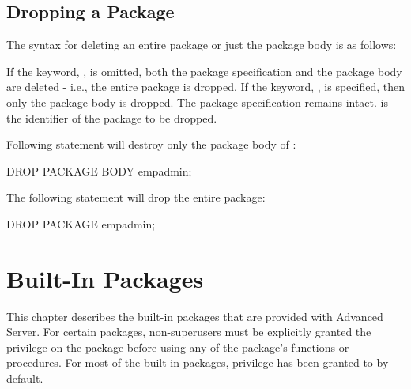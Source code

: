 \documentclass[letterpaper,10pt,english,openany,oneside]{sphinxmanual}
\begin{document}
\newpage


\section{Dropping a Package}
\label{\detokenize{dropping_a_package::doc}}\label{\detokenize{dropping_a_package:dropping-a-package}}
The syntax for deleting an entire package or just the package body is as
follows:


If the keyword, , is omitted, both the package specification and the
package body are deleted - i.e., the entire package is dropped. If the
keyword, , is specified, then only the package body is dropped. The
package specification remains intact.  is the identifier
of the package to be dropped.

Following statement will destroy only the package body of :

%
\begin{sphinxVerbatim}[commandchars=\\\{\}]
DROP PACKAGE BODY emp\PYGZus{}admin;
\end{sphinxVerbatim}

The following statement will drop the entire  package:

%
\begin{sphinxVerbatim}[commandchars=\\\{\}]
DROP PACKAGE emp\PYGZus{}admin;
\end{sphinxVerbatim}

\newpage


\chapter{Built-In Packages}
\label{\detokenize{built-in_packages::doc}}\label{\detokenize{built-in_packages:built-in-packages}}
This chapter describes the built-in packages that are provided with
Advanced Server. For certain packages, non-superusers must be explicitly
granted the  privilege on the package before using any of the
package’s functions or procedures. For most of the built-in packages,
 privilege has been granted to  by default.
\end{document}
